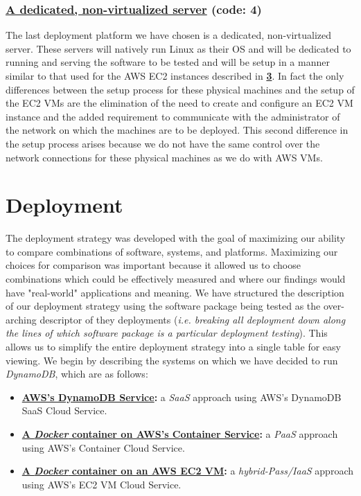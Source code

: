 \documentclass{article}[12pt]
\numberwithin{equation}{section}
\begin{document}
\begin{flushleft}
\subsubsection{\underline{A dedicated, non-virtualized server} (code: \textbf{4})}
\begin{spacing}{1.5}
	The last deployment platform we have chosen is a dedicated, non-virtualized server.  These servers will natively run Linux as their OS and will be dedicated to running and serving the software to be tested and will be setup in a manner similar to that used for the AWS EC2 instances described in \textbf{\underline{3}}.  In fact the only differences between the setup process for these physical machines and the setup of the EC2 VMs are the elimination of the need to create and configure an EC2 VM instance and the added requirement to communicate with the administrator of the network on which the machines are to be deployed.  This second difference in the setup process arises because we do not have the same control over the network connections for these physical machines as we do with AWS VMs.
\end{spacing}











\section{Deployment}
\begin{spacing}{1.5}
The deployment strategy was developed with the goal of maximizing our ability to compare combinations of software, systems, and platforms.  Maximizing our choices for comparison was important because it allowed us to choose combinations which could be effectively measured and where our findings would have "real-world" applications and meaning.  We have structured the description of our deployment strategy using the software package being tested as the over-arching descriptor of they deployments (\emph{i.e. breaking all deployment down along the lines of which software package is a particular deployment testing}).  This allows us to simplify the entire deployment strategy into a single table for easy viewing. We begin by describing the systems on which we have decided to run \emph{DynamoDB}, which are as follows:

\begin{itemize}
	\item \textbf{\underline{AWS's DynamoDB Service}:} a \emph{SaaS} approach using AWS's DynamoDB SaaS Cloud Service.
	\item \textbf{\underline{A \emph{Docker} container on AWS's Container Service}:} a \emph{PaaS} approach using AWS's Container Cloud Service.
	\item \textbf{\underline{A \emph{Docker} container on an AWS EC2 VM}:} a \emph{hybrid-Pass/IaaS} approach using AWS's EC2 VM Cloud Service.
\end{itemize}



\end{spacing}
\end{flushleft}
\end{document}

